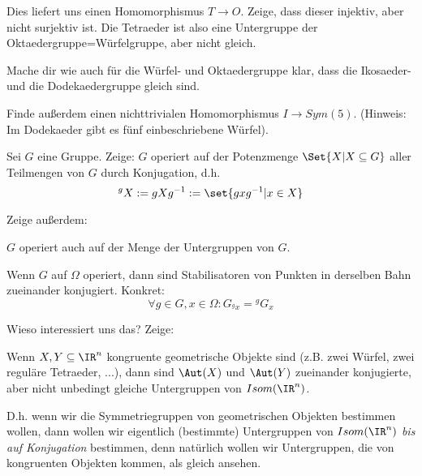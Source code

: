\begin{sheet}
\begin{problem}[title={Gruppenhomomorphismen}]
\begin{subproblem}

Dies liefert uns einen Homomorphismus $T\to O$. Zeige, dass dieser injektiv, aber nicht surjektiv ist. Die Tetraeder ist also eine Untergruppe der Oktaedergruppe=Würfelgruppe, aber nicht gleich.
\end{subproblem}

\begin{subproblem}[difficulty={mittel bis schwer}]
Mache dir wie auch für die Würfel- und Oktaedergruppe klar, dass die Ikosaeder- und die Dodekaedergruppe gleich sind.

Finde außerdem einen nichttrivialen Homomorphismus $I\to Sym(5)$. (Hinweis: Im Dodekaeder gibt es fünf einbeschriebene Würfel).
\end{subproblem}
\end{problem}


\begin{problem}[title={Operation auf Teilmengen durch Konjugation}]
Sei $G$ eine Gruppe. Zeige: $G$ operiert auf der Potenzmenge $\Set{X | X\subseteq G}$ aller Teilmengen von $G$ durch Konjugation, d.h.
\[{^g X} := gXg^{-1} := \set{gxg^{-1} | x\in X}\]

Zeige außerdem:
\begin{subproblem}
$G$ operiert auch auf der Menge der Untergruppen von $G$.
\end{subproblem}
\begin{subproblem}
Wenn $G$ auf $\Omega$ operiert, dann sind Stabilisatoren von Punkten in derselben Bahn zueinander konjugiert. Konkret:
\[\forall g\in G, x\in\Omega: G_{^g x} = {^g G_x}\]
\end{subproblem}

Wieso interessiert uns das? Zeige:
\begin{subproblem}
Wenn $X,Y\subseteq\IR^n$ kongruente geometrische Objekte sind (z.B. zwei Würfel, zwei reguläre Tetraeder, ...), dann sind $\Aut(X)$ und $\Aut(Y)$ zueinander konjugierte, aber nicht unbedingt gleiche Untergruppen von $Isom(\IR^n)$.
\end{subproblem}
D.h. wenn wir die Symmetriegruppen von geometrischen Objekten bestimmen wollen, dann wollen wir eigentlich (bestimmte) Untergruppen von $Isom(\IR^n)$ \emph{bis auf Konjugation} bestimmen, denn natürlich wollen wir Untergruppen, die von kongruenten Objekten kommen, als gleich ansehen.
\end{problem}



\end{sheet}
